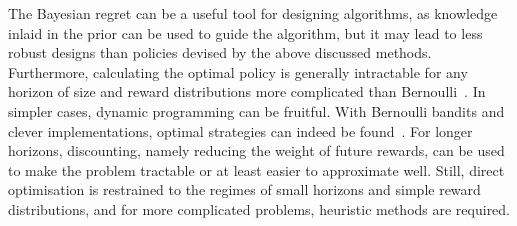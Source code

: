 The Bayesian regret can be a useful tool for designing algorithms, as knowledge inlaid in the prior can be used to guide the algorithm, but it may lead to less robust designs than policies devised by the above discussed methods.
Furthermore, calculating the optimal policy is generally intractable for any horizon of size and reward distributions more complicated than Bernoulli~\autocite{lattimore2020}.
In simpler cases, dynamic programming can be fruitful.
With Bernoulli bandits and clever implementations, optimal strategies can indeed be found~\autocite{pilarski2021}.
For longer horizons, discounting, namely reducing the weight of future rewards, can be used to make the problem tractable or at least easier to approximate well.
Still, direct optimisation is restrained to the regimes of small horizons and simple reward distributions, and for more complicated problems, heuristic methods are required.